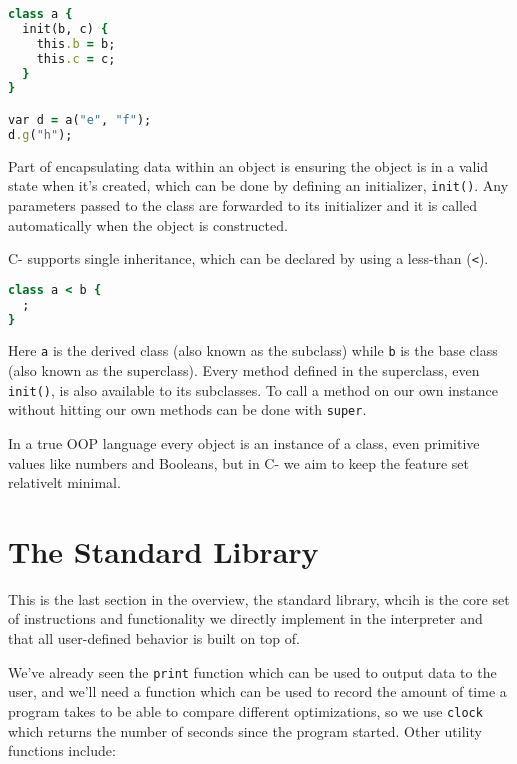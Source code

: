 \begin{lstlisting}[language=ruby]
class a {
  init(b, c) {
    this.b = b;
    this.c = c;
  }
}

var d = a("e", "f");
d.g("h");
\end{lstlisting}

Part of encapsulating data within an object is ensuring the object is in a valid state when it’s created, which can be done by defining an initializer, \verb+init()+. Any parameters passed to the class are forwarded to its initializer and it is called automatically when the object is constructed.

C- supports single inheritance, which can be declared by using a less-than (\verb+<+). 

\begin{lstlisting}[language=ruby]
class a < b {
  ;
}
\end{lstlisting}

Here \verb+a+ is the derived class (also known as the subclass) while \verb+b+ is the base class (also known as the superclass). Every method defined in the superclass, even \verb+init()+, is also available to its subclasses. To call a method on our own instance without hitting our own methods can be done with \verb+super+.

In a true OOP language every object is an instance of a class, even primitive values like numbers and Booleans, but in C- we aim to keep the feature set relativelt minimal.

\section{The Standard Library}

This is the last section in the overview, the standard library, whcih is the core set of instructions and functionality we directly implement in the interpreter and that all user-defined behavior is built on top of.

We've already seen the \verb+print+ function which can be used to output data to the user, and we'll need a function which can be used to record the amount of time a program takes to be able to compare different optimizations, so we use \verb+clock+ which returns the number of seconds since the program started. Other utility functions include:

